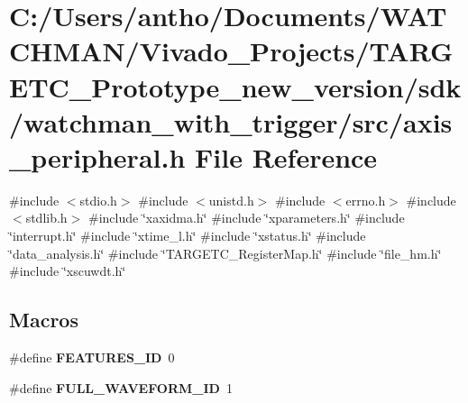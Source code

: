 \section{C\+:/\+Users/antho/\+Documents/\+W\+A\+T\+C\+H\+M\+A\+N/\+Vivado\+\_\+\+Projects/\+T\+A\+R\+G\+E\+T\+C\+\_\+\+Prototype\+\_\+new\+\_\+version/sdk/watchman\+\_\+with\+\_\+trigger/src/axis\+\_\+peripheral.h File Reference}
\label{axis__peripheral_8h}
{\ttfamily \#include $<$stdio.\+h$>$}\newline
{\ttfamily \#include $<$unistd.\+h$>$}\newline
{\ttfamily \#include $<$errno.\+h$>$}\newline
{\ttfamily \#include $<$stdlib.\+h$>$}\newline
{\ttfamily \#include \char`\"{}xaxidma.\+h\char`\"{}}\newline
{\ttfamily \#include \char`\"{}xparameters.\+h\char`\"{}}\newline
{\ttfamily \#include \char`\"{}interrupt.\+h\char`\"{}}\newline
{\ttfamily \#include \char`\"{}xtime\+\_\+l.\+h\char`\"{}}\newline
{\ttfamily \#include \char`\"{}xstatus.\+h\char`\"{}}\newline
{\ttfamily \#include \char`\"{}data\+\_\+analysis.\+h\char`\"{}}\newline
{\ttfamily \#include \char`\"{}T\+A\+R\+G\+E\+T\+C\+\_\+\+Register\+Map.\+h\char`\"{}}\newline
{\ttfamily \#include \char`\"{}file\+\_\+hm.\+h\char`\"{}}\newline
{\ttfamily \#include \char`\"{}xscuwdt.\+h\char`\"{}}\newline
\subsection*{Macros}
\begin{DoxyCompactItemize}
\item 
\mbox{\label{axis__peripheral_8h_a7d0187167e381bab6a565d6502961797}} 
\#define {\bfseries F\+E\+A\+T\+U\+R\+E\+S\+\_\+\+ID}~0
\item 
\mbox{\label{axis__peripheral_8h_a359e2a99a817c2e9dcd11ce4ba7485f8}} 
\#define {\bfseries F\+U\+L\+L\+\_\+\+W\+A\+V\+E\+F\+O\+R\+M\+\_\+\+ID}~1
\end{DoxyCompactItemize}
